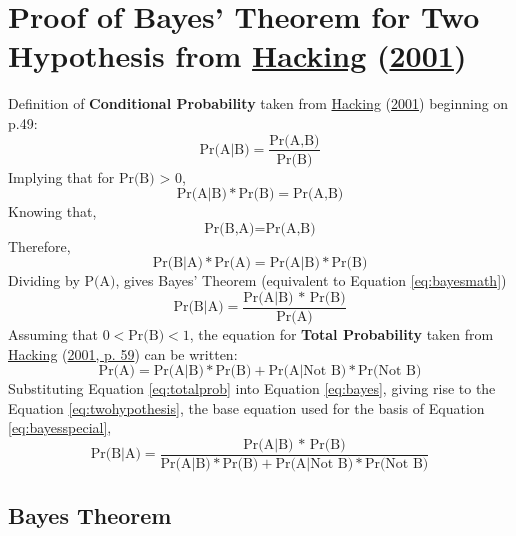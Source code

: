 \documentclass[12pt,twoside]{reedthesis}
\begin{document}
\hypertarget{bayesproof}{%
\section{\texorpdfstring{Proof of Bayes' Theorem for Two Hypothesis from \protect\hyperlink{ref-hackingIntroductionProbabilityInductive2001}{Hacking} (\protect\hyperlink{ref-hackingIntroductionProbabilityInductive2001}{2001})}{Proof of Bayes' Theorem for Two Hypothesis from Hacking (2001)}}\label{bayesproof}}

Definition of \textbf{Conditional Probability} taken from \protect\hyperlink{ref-hackingIntroductionProbabilityInductive2001}{Hacking} (\protect\hyperlink{ref-hackingIntroductionProbabilityInductive2001}{2001}) beginning on p.49:
\begin{equation}
\text{Pr(A|B)}= \frac{\text{Pr(A,B)}}{\text{Pr(B)}} 
\label{eq:conditionalprob}
\end{equation}
Implying that for \(\text{Pr(B) > 0}\),
\begin{equation}
\text{Pr(A|B)} * \text{Pr(B)} = \text{Pr(A,B)}  
\label{eq:conditionalprobproof1}
\end{equation}
Knowing that,
\begin{equation}
\text{Pr(B,A)} = \text{Pr(A,B)} 
\label{eq:conditionalprobproof2}
\end{equation}
Therefore,
\begin{equation}
\text{Pr(B|A)} * \text{Pr(A)} = \text{Pr(A|B)} * \text{Pr(B)} 
\label{eq:conditionalprobproof3}
\end{equation}
Dividing by \(\text{P(A)}\), gives Bayes' Theorem (equivalent to Equation \eqref{eq:bayesmath})
\begin{equation}
\text{Pr(B|A)}= \frac{\text{Pr(A|B) * Pr(B)}}{\text{Pr(A)}} 
\label{eq:bayes}
\end{equation}
Assuming that \(0 < \text{Pr(B)} < 1\), the equation for \textbf{Total Probability} taken from \protect\hyperlink{ref-hackingIntroductionProbabilityInductive2001}{Hacking} (\protect\hyperlink{ref-hackingIntroductionProbabilityInductive2001}{2001, p. 59}) can be written:
\begin{equation}
\text{Pr(A)} = \text{Pr(A|B)} * \text{Pr(B)} + \text{Pr(A|Not B)} * \text{Pr(Not B)}
\label{eq:totalprob}
\end{equation}
Substituting Equation \eqref{eq:totalprob} into Equation \eqref{eq:bayes}, giving rise to the Equation \eqref{eq:twohypothesis}, the base equation used for the basis of Equation \eqref{eq:bayesspecial},
\begin{equation}
\text{Pr(B|A)}= \frac{\text{Pr(A|B) * Pr(B)}}{\text{Pr(A|B)} * \text{Pr(B)} + \text{Pr(A|Not B)} * \text{Pr(Not B)}} 
\label{eq:twohypothesis}
\end{equation}
\hypertarget{bayesthe}{%
\subsection{Bayes Theorem}\label{bayesthe}}
\end{document}
